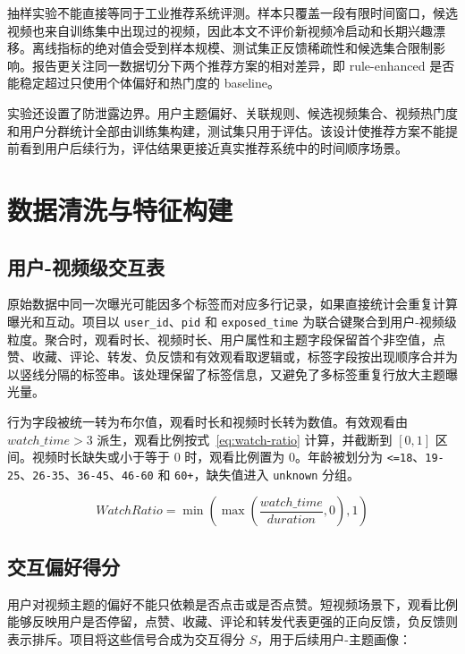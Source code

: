 \documentclass[UTF8,a4paper,12pt,fontset=none]{ctexart}
\begin{document}
抽样实验不能直接等同于工业推荐系统评测。样本只覆盖一段有限时间窗口，候选视频也来自训练集中出现过的视频，因此本文不评价新视频冷启动和长期兴趣漂移。离线指标的绝对值会受到样本规模、测试集正反馈稀疏性和候选集合限制影响。报告更关注同一数据切分下两个推荐方案的相对差异，即 rule-enhanced 是否能稳定超过只使用个体偏好和热门度的 baseline。

实验还设置了防泄露边界。用户主题偏好、关联规则、候选视频集合、视频热门度和用户分群统计全部由训练集构建，测试集只用于评估。该设计使推荐方案不能提前看到用户后续行为，评估结果更接近真实推荐系统中的时间顺序场景。

\section{数据清洗与特征构建}

\subsection{用户-视频级交互表}

原始数据中同一次曝光可能因多个标签而对应多行记录，如果直接统计会重复计算曝光和互动。项目以 \texttt{user\_id}、\texttt{pid} 和 \texttt{exposed\_time} 为联合键聚合到用户-视频级粒度。聚合时，观看时长、视频时长、用户属性和主题字段保留首个非空值，点赞、收藏、评论、转发、负反馈和有效观看取逻辑或，标签字段按出现顺序合并为以竖线分隔的标签串。该处理保留了标签信息，又避免了多标签重复行放大主题曝光量。

行为字段被统一转为布尔值，观看时长和视频时长转为数值。有效观看由 \(watch\_time>3\) 派生，观看比例按式~\ref{eq:watch-ratio} 计算，并截断到 \([0,1]\) 区间。视频时长缺失或小于等于 0 时，观看比例置为 0。年龄被划分为 \texttt{<=18}、\texttt{19-25}、\texttt{26-35}、\texttt{36-45}、\texttt{46-60} 和 \texttt{60+}，缺失值进入 \texttt{unknown} 分组。

\begin{equation}
\label{eq:watch-ratio}
WatchRatio=\min\left(\max\left(\frac{watch\_time}{duration},0\right),1\right)
\end{equation}

\subsection{交互偏好得分}

用户对视频主题的偏好不能只依赖是否点击或是否点赞。短视频场景下，观看比例能够反映用户是否停留，点赞、收藏、评论和转发代表更强的正向反馈，负反馈则表示排斥。项目将这些信号合成为交互得分 \(S\)，用于后续用户-主题画像：
\end{document}
